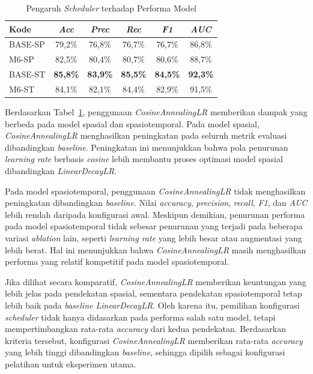 \begin{table}[htbp]
\centering
\caption{Pengaruh \textit{Scheduler} terhadap Performa Model}
\label{table:4.ablation-scheduler}
\begin{tabular}{lccccc}
\toprule
\textbf{Kode} &
\textbf{\textit{Acc}} &
\textbf{\textit{Prec}} &
\textbf{\textit{Rec}} &
\textbf{\textit{F1}} &
\textbf{\textit{AUC}} \\
\midrule
BASE-SP & 79,2\% & 76,8\% & 76,7\% & 76,7\% & 86,8\% \\
M6-SP & 82,5\% & 80,4\% & 80,7\% & 80,6\% & 88,7\% \\
\midrule
BASE-ST & \textbf{85,8\%} & \textbf{83,9\%} & \textbf{85,5\%} & \textbf{84,5\%} & \textbf{92,3\%} \\
M6-ST & 84,1\% & 82,1\% & 84,4\% & 82,9\% & 91,5\% \\
\bottomrule
\end{tabular}
\end{table}

Berdasarkan Tabel~\ref{table:4.ablation-scheduler}, penggunaan \textit{CosineAnnealingLR} memberikan dampak yang berbeda pada model spasial dan spasiotemporal. Pada model spasial, \textit{CosineAnnealingLR} menghasilkan peningkatan pada seluruh metrik evaluasi dibandingkan \textit{baseline}. Peningkatan ini menunjukkan bahwa pola penurunan \textit{learning rate} berbasis \textit{cosine} lebih membantu proses optimasi model spasial dibandingkan \textit{LinearDecayLR}.

Pada model spasiotemporal, penggunaan \textit{CosineAnnealingLR} tidak menghasilkan peningkatan dibandingkan \textit{baseline}. Nilai \textit{accuracy}, \textit{precision}, \textit{recall}, \textit{F1}, dan \textit{AUC} lebih rendah daripada konfigurasi awal. Meskipun demikian, penurunan performa pada model spasiotemporal tidak sebesar penurunan yang terjadi pada beberapa variasi \textit{ablation} lain, seperti \textit{learning rate} yang lebih besar atau augmentasi yang lebih berat. Hal ini menunjukkan bahwa \textit{CosineAnnealingLR} masih menghasilkan performa yang relatif kompetitif pada model spasiotemporal.

Jika dilihat secara komparatif, \textit{CosineAnnealingLR} memberikan keuntungan yang lebih jelas pada pendekatan spasial, sementara pendekatan spasiotemporal tetap lebih baik pada \textit{baseline LinearDecayLR}. Oleh karena itu, pemilihan konfigurasi \textit{scheduler} tidak hanya didasarkan pada performa salah satu model, tetapi mempertimbangkan rata-rata \textit{accuracy} dari kedua pendekatan. Berdasarkan kriteria tersebut, konfigurasi \textit{CosineAnnealingLR} memberikan rata-rata \textit{accuracy} yang lebih tinggi dibandingkan \textit{baseline}, sehingga dipilih sebagai konfigurasi pelatihan untuk eksperimen utama.

